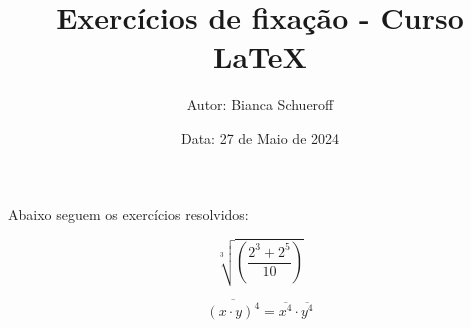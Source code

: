\documentclass[a4paper, 12pt]{article}
\title{\textbf{Exercícios de fixação - Curso LaTeX}}
\author{Autor: Bianca Schueroff}
\date{Data: 27 de Maio de 2024}
\begin{document}
\maketitle

Abaixo seguem os exercícios resolvidos:

\begin{equation}
\sqrt[3]{\left(\frac{2^{3}+2^{5}}{10}\right)}
\end{equation}

\begin{equation}
\overline{(x\cdot y)^{4}}=\overline{x^{4}}\cdot\overline{y^{4}}
\end{equation}
\end{document}
